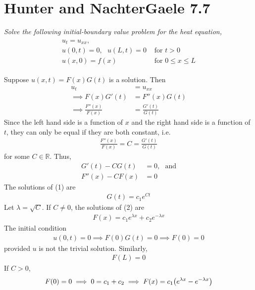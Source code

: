 \documentclass[12pt]{article}
\theoremstyle{plain}
\begin{document}
\section*{Hunter and NachterGaele 7.7}
\emph{Solve the following initial-boundary value problem for the heat equation,}
\begin{align*}
    \begin{array}{ll}
    u_t = u_{xx}, & \\
    u(0, t) = 0,\ \ \ u(L,t) = 0 & \text{ for } t > 0 \\
    u(x, 0) = f(x) & \text{ for } 0 \leq x \leq L
    \end{array}
\end{align*}

Suppose $u(x,t) = F(x)G(t)$ is a solution.  Then
\begin{align*}
    u_t &= u_{xx} \\
    \implies F(x)G'(t) &= F''(x)G(t) \\
    \implies \frac{F''(x)}{F(x)} &= \frac{G'(t)}{G(t)}
\end{align*}
Since the left hand side is a function of $x$ and the right hand side is a function of $t$, they can only be equal if they are both constant, i.e.
\begin{align*}
    \frac{F''(x)}{F(x)} = C = \frac{G'(t)}{G(t)}
\end{align*}
for some $C \in \mathbb{R}$.  Thus,
\begin{align}
    G'(t) - C G(t) &= 0,\ \ \ \text{and} \\
    F''(x) - C F(x) &= 0
\end{align}
The solutions of (1) are
\begin{align*}
    G(t) = c_1 e^{Ct}
\end{align*}
Let $\lambda = \sqrt{C}$.  If $C \neq 0$, the solutions of (2) are
\begin{align*}
    F(x) = c_1 e^{\lambda x} + c_2 e^{-\lambda x}
\end{align*}
The initial condition
\begin{align*}
    u(0,t) = 0 \implies F(0)G(t) = 0 \implies F(0) = 0
\end{align*}
provided $u$ is not the trivial solution.  Similarly,
\begin{align*}
    F(L) = 0
\end{align*}
If $C > 0$,
\begin{align*}
    F(0) = 0 \implies 0 = c_1 + c_2 \implies F(x) = c_1\qty(e^{\lambda x} - e^{-\lambda x})
\end{align*}
\end{document}
